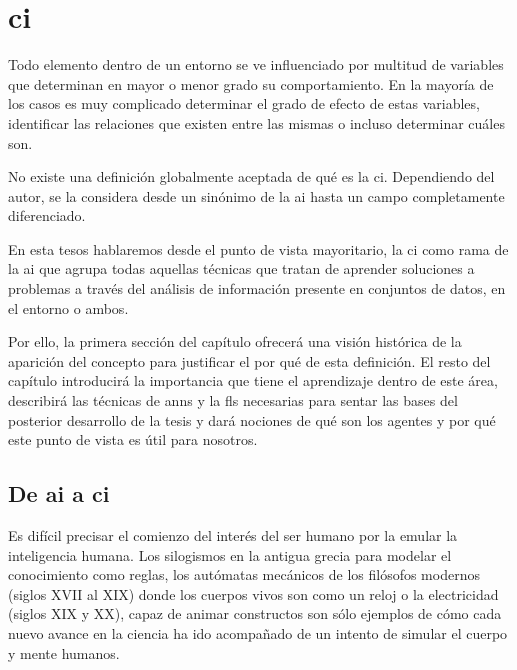 \chapter{\Acrlong{ci}}
\label{ch:sota-ci}

Todo elemento dentro de un entorno se ve influenciado por multitud de variables que determinan en mayor o menor grado su comportamiento. En la mayoría de los casos es muy complicado determinar el grado de efecto de estas variables, identificar las relaciones que existen entre las mismas o incluso determinar cuáles son.

No existe una definición globalmente aceptada de qué es la \acf{ci}. Dependiendo del autor, se la considera desde un sinónimo de la \acf{ai} hasta un campo completamente diferenciado.

En esta tesos hablaremos desde el punto de vista mayoritario, la \ac{ci} como rama de la \ac{ai} que agrupa todas aquellas técnicas que tratan de aprender soluciones a problemas a través del análisis de información presente en conjuntos de datos, en el entorno o ambos.

Por ello, la primera sección del capítulo ofrecerá una visión histórica de la aparición del concepto para justificar el por qué de esta definición. El resto del capítulo introducirá la importancia que tiene el aprendizaje dentro de este área, describirá las técnicas de \acp{ann} y la \acp{fl} necesarias para sentar las bases del posterior desarrollo de la tesis y dará nociones de qué son los agentes y por qué este punto de vista es útil para nosotros.

\section{De \acrlong{ai} a \acrlong{ci}}

Es difícil precisar el comienzo del interés del ser humano por la emular la inteligencia humana. Los silogismos en la antigua grecia para modelar el conocimiento como reglas, los autómatas mecánicos de los filósofos modernos (siglos XVII al XIX) donde los cuerpos vivos son como un reloj o la electricidad (siglos XIX y XX), capaz de animar constructos son sólo ejemplos de cómo cada nuevo avance en la ciencia ha ido acompañado de un intento de simular el cuerpo y mente humanos.

